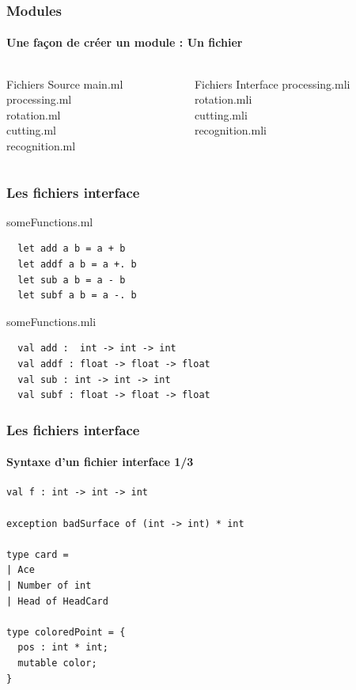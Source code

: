\begin{frame}
	\frametitle{Modules}
	\framesubtitle{Une façon de créer un module : Un fichier}
	\begin{columns}[t]
		\begin{column}{3cm}
			\begin{block}{Fichiers Source}
				main.ml\\
				processing.ml\\
				rotation.ml\\
				cutting.ml\\
				recognition.ml
			\end{block}
		\end{column}
		\begin{column}{3cm}
			\begin{block}{Fichiers Interface}
				processing.mli\\
				rotation.mli\\
				cutting.mli\\
				recognition.mli
			\end{block}
		\end{column}
	\end{columns}
\end{frame}

\begin{frame}[fragile]
	\frametitle{Les fichiers interface}
	\begin{block}{someFunctions.ml}
		\begin{lstlisting}
  let add a b = a + b
  let addf a b = a +. b
  let sub a b = a - b
  let subf a b = a -. b
		\end{lstlisting}
	\end{block}
	\begin{block}{someFunctions.mli}
		\begin{lstlisting}
  val add :  int -> int -> int
  val addf : float -> float -> float
  val sub : int -> int -> int
  val subf : float -> float -> float
		\end{lstlisting}
	\end{block}
\end{frame}

\begin{frame}[fragile]
	\frametitle{Les fichiers interface}
	\framesubtitle{Syntaxe d'un fichier interface 1/3}
	\lstset{basicstyle=\small}
	\begin{lstlisting}
val f : int -> int -> int

exception badSurface of (int -> int) * int

type card =
| Ace
| Number of int
| Head of HeadCard

type coloredPoint = {
  pos : int * int;
  mutable color;
}
	\end{lstlisting}
\end{frame}

